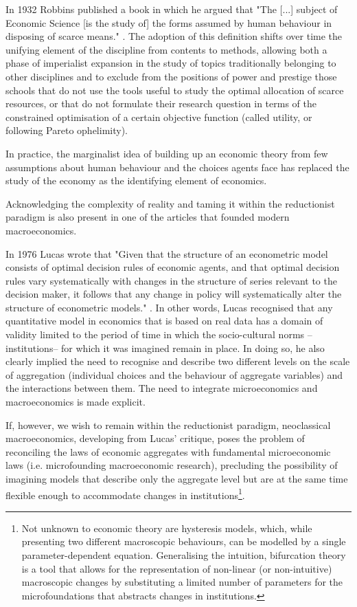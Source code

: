 In 1932 Robbins published a book in which he argued that "The [...] subject of Economic Science [is the study of] the forms assumed by human behaviour in disposing of scarce means." \parencite[p. 15]{robbins2007}.
The adoption of this definition shifts over time the unifying element of the discipline from contents to methods, allowing both a phase of imperialist expansion in the study of topics traditionally belonging to other disciplines \parencite[see][]{stigler1984, lazear2000} and to exclude from the positions of power and prestige those schools that do not use the tools useful to study the optimal allocation of scarce resources, or that do not formulate their research question in terms of the constrained optimisation of a certain objective function (called utility, or following Pareto ophelimity).

In practice, the marginalist idea of building up an economic theory from few assumptions about human behaviour and the choices agents face has replaced the study of the economy as the identifying element of economics.

Acknowledging the complexity of reality and taming it within the reductionist paradigm is also present in one of the articles that founded modern macroeconomics.

In 1976 Lucas wrote that "Given that the structure of an econometric model consists of optimal decision rules of economic agents, and that optimal decision rules vary systematically with changes in the structure of series relevant to the decision maker, it follows that any change in policy will systematically alter the structure of econometric models." \parencite{lucas1976}.
In other words, Lucas recognised that any quantitative model in economics that is based on real data has a domain of validity limited to the period of time in which the socio-cultural norms --institutions-- for which it was imagined remain in place.
In doing so, he also clearly implied the need to recognise and describe two different levels on the scale of aggregation (individual choices and the behaviour of aggregate variables) and the interactions between them. The need to integrate microeconomics and macroeconomics is made explicit.

If, however, we wish to remain within the reductionist paradigm, neoclassical macroeconomics, developing from Lucas' critique, poses the problem of reconciling the laws of economic aggregates with fundamental microeconomic laws (i.e. microfounding macroeconomic research), precluding the possibility of imagining models that describe only the aggregate level but are at the same time flexible enough to accommodate changes in institutions\footnote{Not unknown to economic theory are hysteresis models, which, while presenting two different macroscopic behaviours, can be modelled by a single parameter-dependent equation. Generalising the intuition, bifurcation theory is a tool that allows for the representation of non-linear (or non-intuitive) macroscopic changes by substituting a limited number of parameters for the microfoundations that abstracts changes in institutions.}.

